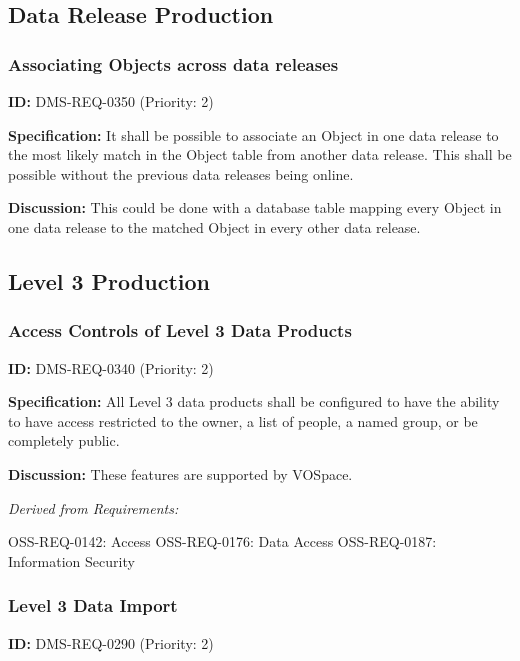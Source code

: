 \documentclass[SE,toc,lsstdraft]{lsstdoc}
\begin{document}
\subsection{Data Release Production}

\subsubsection{Associating Objects across data releases}

\label{DMS-REQ-0350}
\textbf{ID:} DMS-REQ-0350 (Priority: 2)

\textbf{Specification:} It shall be possible to associate an Object in one data release to the most likely match in the Object table from another data release. This shall be possible without the previous data releases being online.

\textbf{Discussion:} This could be done with a database table mapping every Object in one data release to the matched Object in every other data release.

\subsection{Level 3 Production}

\subsubsection{Access Controls of Level 3 Data Products}

\label{DMS-REQ-0340}
\textbf{ID:} DMS-REQ-0340 (Priority: 2)

\textbf{Specification:} All Level 3 data products shall be configured to have the ability to have access restricted to the owner, a list of people, a named group, or be completely public.

\textbf{Discussion:} These features are supported by VOSpace.

\emph{Derived from Requirements:}

OSS-REQ-0142:
Access \newline
OSS-REQ-0176:
Data Access \newline
OSS-REQ-0187:
Information Security \newline

\subsubsection{Level 3 Data Import}

\label{DMS-REQ-0290}
\textbf{ID:} DMS-REQ-0290 (Priority: 2)
\end{document}
